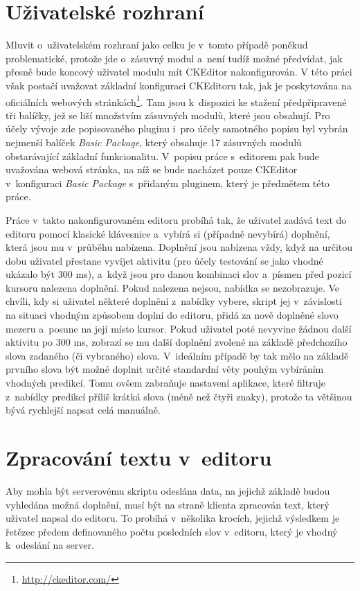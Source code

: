 \documentclass[a4paper,11pt,openany]{book} %
\begin{document}
\section{Uživatelské rozhraní}\label{ui}

Mluvit o~uživatelském rozhraní jako celku je v~tomto případě poněkud problematické, protože jde o~zásuvný modul a~není tudíž možné předvídat, jak přesně bude koncový uživatel modulu mít CKEditor nakonfigurován. V této práci však postačí uvažovat základní konfiguraci CKEditoru tak, jak je poskytována na oficiálních webových stránkách\footnote{\url{http://ckeditor.com/}}. Tam jsou k~dispozici ke stažení předpřipravené tři balíčky, jež se liší množstvím zásuvných modulů, které jsou obsahují. Pro účely vývoje zde popisovaného pluginu i~pro účely samotného popisu byl vybrán nejmenší balíček {\it Basic Package}, který obsahuje 17 zásuvných modulů obstarávající základní funkcionalitu. V~popisu práce s~editorem pak bude uvažována webová stránka, na níž se bude nacházet pouze CKEditor v~konfiguraci {\it Basic Package} s~přidaným pluginem, který je předmětem této práce.

Práce v~takto nakonfigurovaném editoru probíhá tak, že uživatel zadává text do editoru pomocí klasické klávesnice a~vybírá si (případně nevybírá) doplnění, která jsou mu v~průběhu nabízena. Doplnění jsou nabízena vždy, když na určitou dobu uživatel přestane vyvíjet aktivitu (pro účely testování se jako vhodné ukázalo být 300 ms), a~když jsou pro danou kombinaci slov a~písmen před pozicí kursoru nalezena doplnění. Pokud nalezena nejsou, nabídka se nezobrazuje. Ve chvíli, kdy si uživatel některé doplnění z~nabídky vybere, skript jej v~závislosti na situaci vhodným způsobem doplní do editoru, přidá za nově doplněné slovo mezeru a~posune na její místo kursor. Pokud uživatel poté nevyvine žádnou další aktivitu po 300 ms, zobrazí se mu další doplnění zvolené na základě předchozího slova zadaného (či vybraného) slova. V~ideálním případě by tak mělo na základě prvního slova být možné doplnit určité standardní věty pouhým vybíráním vhodných predikcí. Tomu ovšem zabraňuje nastavení aplikace, které filtruje z~nabídky predikcí příliš krátká slova (méně než čtyři znaky), protože ta většinou bývá rychlejší napsat celá manuálně.

\section{Zpracování textu v~editoru}

Aby mohla být serverovému skriptu odeslána data, na jejichž základě budou vyhledána možná doplnění, musí být na straně klienta zpracován text, který uživatel napsal do editoru. To probíhá v~několika krocích, jejichž výsledkem je řetězec předem definovaného počtu posledních slov v~editoru, který je vhodný k~odeslání na server.
\end{document}
